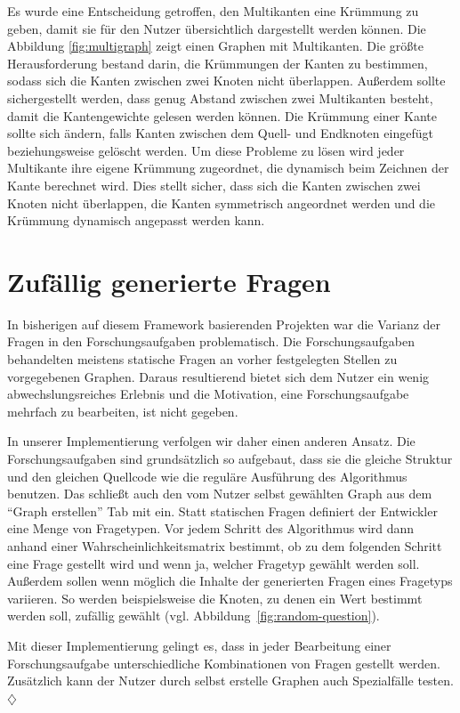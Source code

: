 Es wurde eine Entscheidung getroffen, den Multikanten eine Krümmung zu geben, damit sie für den Nutzer übersichtlich dargestellt werden können. Die Abbildung \ref{fig:multigraph} zeigt einen Graphen mit Multikanten. Die größte Herausforderung bestand darin, die Krümmungen der Kanten zu bestimmen, sodass sich die Kanten zwischen zwei Knoten nicht überlappen. Außerdem sollte sichergestellt werden, dass genug Abstand zwischen zwei Multikanten besteht, damit die Kantengewichte gelesen werden können. Die Krümmung einer Kante sollte sich ändern, falls Kanten zwischen dem Quell- und Endknoten eingefügt beziehungsweise gelöscht werden. Um diese Probleme zu lösen wird jeder Multikante ihre eigene Krümmung zugeordnet, die dynamisch beim Zeichnen der Kante berechnet wird. Dies stellt sicher, dass sich die Kanten zwischen zwei Knoten nicht überlappen, die Kanten symmetrisch angeordnet werden und die Krümmung dynamisch angepasst werden kann.

\section{Zufällig generierte Fragen} %
In bisherigen auf diesem Framework basierenden Projekten war die Varianz der Fragen in den Forschungsaufgaben problematisch. Die Forschungsaufgaben behandelten meistens statische Fragen an vorher festgelegten Stellen zu vorgegebenen Graphen. Daraus resultierend bietet sich dem Nutzer ein wenig abwechslungsreiches Erlebnis und die Motivation, eine Forschungsaufgabe mehrfach zu bearbeiten, ist nicht gegeben.

In unserer Implementierung verfolgen wir daher einen anderen Ansatz. Die Forschungsaufgaben sind grundsätzlich so aufgebaut, dass sie die gleiche Struktur und den gleichen Quellcode wie die reguläre Ausführung des Algorithmus benutzen. Das schließt auch den vom Nutzer selbst gewählten Graph aus dem \enquote{Graph erstellen} Tab mit ein. Statt statischen Fragen definiert der Entwickler eine Menge von Fragetypen. Vor jedem Schritt des Algorithmus wird dann anhand einer Wahrscheinlichkeitsmatrix bestimmt, ob zu dem folgenden Schritt eine Frage gestellt wird und wenn ja, welcher Fragetyp gewählt werden soll. Außerdem sollen wenn möglich die Inhalte der generierten Fragen eines Fragetyps variieren. So werden beispielsweise die Knoten, zu denen ein Wert bestimmt werden soll, zufällig gewählt (vgl. Abbildung~\ref{fig:random-question}).

Mit dieser Implementierung gelingt es, dass in jeder Bearbeitung einer Forschungsaufgabe unterschiedliche Kombinationen von Fragen gestellt werden. Zusätzlich kann der Nutzer durch selbst erstelle Graphen auch Spezialfälle testen. \hfill$\diamondsuit$

